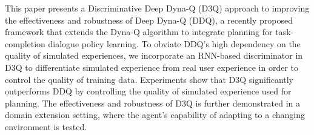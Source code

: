 This paper presents a Discriminative Deep Dyna-Q (D3Q) approach to improving the effectiveness and robustness of Deep Dyna-Q (DDQ), a recently proposed framework that extends the Dyna-Q algorithm to integrate planning for task-completion dialogue policy learning. To obviate DDQ's high dependency on the quality of simulated experiences, we incorporate an RNN-based discriminator in D3Q to differentiate simulated experience from real user experience in order to control the quality of training data. Experiments show that D3Q significantly outperforms DDQ by controlling the quality of simulated experience used for planning. The effectiveness and robustness of D3Q is further demonstrated in a domain extension setting, where the agent's capability of adapting to a changing environment is tested.
